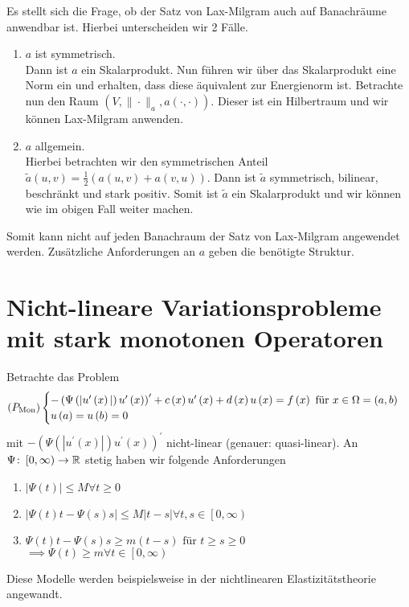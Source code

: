 Es stellt sich die Frage, ob der Satz von Lax-Milgram auch auf Banachräume anwendbar ist. Hierbei unterscheiden wir 2 Fälle.
\begin{enumerate}
	\item $a$ ist symmetrisch. \\
	Dann ist $a$ ein Skalarprodukt. Nun führen wir über das Skalarprodukt eine Norm ein und erhalten, dass diese äquivalent zur Energienorm ist. Betrachte nun den Raum $\left(V,\|\cdot\|_{a},a\left(\cdot,\cdot\right)\right)$. Dieser ist ein Hilbertraum und wir können Lax-Milgram anwenden.
	\item $a$ allgemein.\\
	Hierbei betrachten wir den symmetrischen Anteil $\tilde{a}\left(u,v\right) = \frac{1}{2}\left(a\left(u,v\right)+a\left(v,u\right)\right)$. Dann ist $\tilde{a}$ symmetrisch, bilinear, beschränkt und stark positiv. Somit ist $\tilde{a}$ ein Skalarprodukt und wir können wie im obigen Fall weiter machen.
\end{enumerate}
Somit kann nicht auf jeden Banachraum der Satz von Lax-Milgram angewendet werden. Zusätzliche Anforderungen an $a$ geben die benötigte Struktur.

\section{Nicht-lineare Variationsprobleme mit stark monotonen Operatoren}
Betrachte das Problem
\begin{equation*}
	\left(P_{\text{Mon}}\right)\begin{cases}
		-\left(\Psi\left(|u^{\prime}\left(x\right)|\right)u^{\prime}\left(x\right)\right)^{\prime} + c\left(x\right)u^{\prime}\left(x\right) + d\left(x\right)u\left(x\right) = f\left(x\right) \text{ für } x\in\Omega=\left(a,b\right)\\
		u\left(a\right)=u\left(b\right) = 0
	\end{cases}
\end{equation*}
mit $-\left(\Psi\left(|u^{\prime}\left(x\right)|\right)u^{\prime}\left(x\right)\right)^{\prime}$ nicht-linear (genauer: quasi-linear). An $\Psi\colon\left[0,\infty\right)\to\mathbb{R}$ stetig haben wir folgende Anforderungen
\begin{enumerate}
	\item $|\Psi\left(t\right)|\leq M \forall t\geq 0$
	\item $|\Psi\left(t\right)t-\Psi\left(s\right)s|\leq M|t-s| \forall t,s\in\left[0,\infty\right)${}
	\item $\Psi\left(t\right)t-\Psi\left(s\right)s\geq m\left(t-s\right) \text{ für } t\geq s\geq 0$\\
			$\implies \Psi\left(t\right) \geq m \forall t\in\left[0,\infty\right)$
\end{enumerate}
Diese Modelle werden beispielsweise in der nichtlinearen Elastizitätstheorie angewandt.

